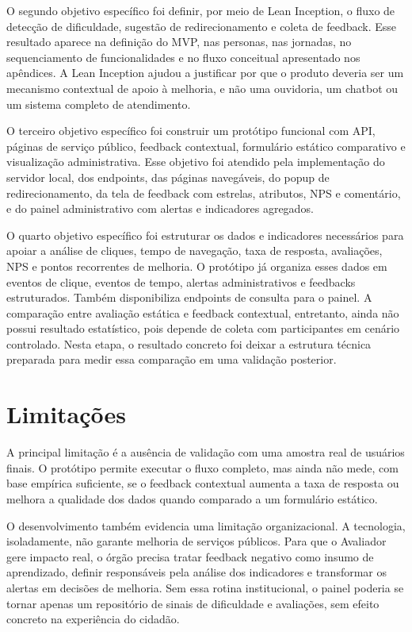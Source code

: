 O segundo objetivo específico foi definir, por meio de Lean Inception, o fluxo de
detecção de dificuldade, sugestão de redirecionamento e coleta de feedback. Esse
resultado aparece na definição do MVP, nas personas, nas jornadas, no
sequenciamento de funcionalidades e no fluxo conceitual apresentado nos
apêndices. A Lean Inception ajudou a justificar por que o produto deveria ser um
mecanismo contextual de apoio à melhoria, e não uma ouvidoria, um chatbot ou um
sistema completo de atendimento.

O terceiro objetivo específico foi construir um protótipo funcional com API,
páginas de serviço público, feedback contextual, formulário estático comparativo
e visualização administrativa. Esse objetivo foi atendido pela implementação do
servidor local, dos endpoints, das páginas navegáveis, do popup de
redirecionamento, da tela de feedback com estrelas, atributos, NPS e comentário,
e do painel administrativo com alertas e indicadores agregados.

O quarto objetivo específico foi estruturar os dados e indicadores necessários
para apoiar a análise de cliques, tempo de navegação, taxa de resposta,
avaliações, NPS e pontos recorrentes de melhoria. O protótipo já organiza esses
dados em eventos de clique, eventos de tempo, alertas administrativos e
feedbacks estruturados. Também disponibiliza endpoints de consulta para o painel.
A comparação entre avaliação estática e feedback contextual, entretanto, ainda
não possui resultado estatístico, pois depende de coleta com participantes em
cenário controlado. Nesta etapa, o resultado concreto foi deixar a estrutura
técnica preparada para medir essa comparação em uma validação posterior.

\section{Limitações}

A principal limitação é a ausência de validação com uma amostra real de usuários
finais. O protótipo permite executar o fluxo completo, mas ainda não mede, com
base empírica suficiente, se o feedback contextual aumenta a taxa de resposta ou
melhora a qualidade dos dados quando comparado a um formulário estático.

O desenvolvimento também evidencia uma limitação organizacional. A tecnologia,
isoladamente, não garante melhoria de serviços públicos. Para que o Avaliador
gere impacto real, o órgão precisa tratar feedback negativo como insumo de
aprendizado, definir responsáveis pela análise dos indicadores e transformar os
alertas em decisões de melhoria. Sem essa rotina institucional, o painel poderia
se tornar apenas um repositório de sinais de dificuldade e avaliações, sem
efeito concreto na experiência do cidadão.

